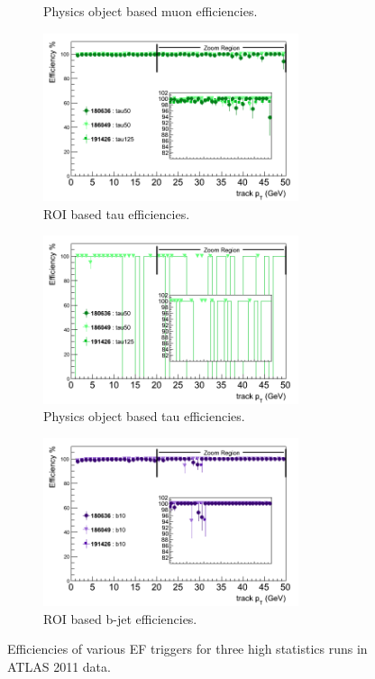 \begin{figure}[htbp]
\begin{subfigure}{.5\linewidth}
		\caption{Physics object based muon efficiencies.}
		\label{fig:trig_2011_EF_pt_d}
	\end{subfigure}
	\begin{subfigure}{.5\linewidth}	
		\centering
		\includegraphics[width=75mm]{f/tau50_IDTrkNoCut_pT_EF_eff}
		\caption{ROI based tau efficiencies.}
		\label{fig:trig_2011_EF_pt_e}
	\end{subfigure}
	\begin{subfigure}{.5\linewidth}	
		\centering
		\includegraphics[width=75mm]{f/tau50_IDTrkNoCut_pT_EF_eff_comb}
		\caption{Physics object based tau efficiencies.}
		\label{fig:trig_2011_EF_pt_f}
	\end{subfigure}
	\begin{center}
	\begin{subfigure}{.5\linewidth}	
		\centering
		\includegraphics[width=75mm]{f/b10_IDTrkNoCut_pT_EF_eff}
		\caption{ROI based b-jet efficiencies.}
		\label{fig:trig_2011_EF_pt_g}
	\end{subfigure}
	\end{center}
	\caption{Efficiencies of various EF triggers for three high statistics runs in ATLAS 2011 data.}
	\label{fig:trig_2011_EF_pt}
\end{figure}

